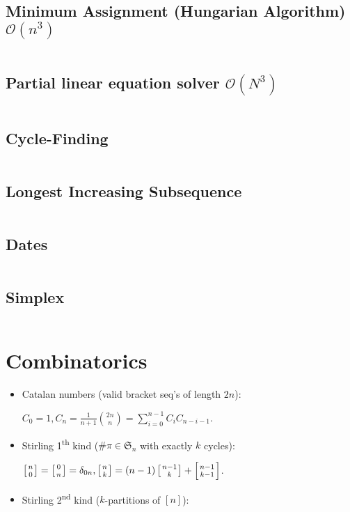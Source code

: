\documentclass[9pt,a4paper,landscape,oneside]{amsart}
\newcommand{\mintedstyle}[2]{\inputminted{#1}{code/#2}}
\newcommand{\code}[1]{\mintedstyle{cpp}{#1}}
\newenvironment{myitemize}
{\begin{itemize}[leftmargin=.3cm]
	\setlength{\itemsep}{0pt}
	\setlength{\parskip}{0pt}
	\setlength{\parsep}{0pt}     }
{ \end{itemize}                  }
\begin{document}
\begin{multicols*}{3}
\subsection{Minimum Assignment (Hungarian Algorithm) $\mathcal{O}(n^{3})$}
\code{minimum_assignment.cpp}

\subsection{Partial linear equation solver $\mathcal{O}(N^3)$}
\code{matrix_solver.cpp}

\subsection{Cycle-Finding}
\code{other/floyds_algorithm.cpp}

\subsection{Longest Increasing Subsequence}
\code{other/lis.cpp}

\subsection{Dates}
\code{other/dates.cpp}

\subsection{Simplex}
\code{other/simplex.cpp}


\section{Combinatorics}
\begin{myitemize}
	\item Catalan numbers (valid bracket seq's of length $2n$):

		$C_0 = 1, C_n = \frac{1}{n+1}\binom{2n}{n} = \sum_{i=0}^{n-1}C_iC_{n-i-1}$.

	\item Stirling 1\textsuperscript{th} kind ($\# \pi \in \mathfrak{S}_n$ with exactly $k$ cycles):

		$\left[{n\atop 0}\right]=\left[{0\atop n}\right] = \delta_{0n}, \left[{n\atop k}\right]=(n-1)\left[{n-1\atop k}\right]+\left[{n-1\atop k-1}\right]$.

	\item Stirling 2\textsuperscript{nd} kind ($k$-partitions of $[n]$):


\end{myitemize}
\end{multicols*}
\end{document}
